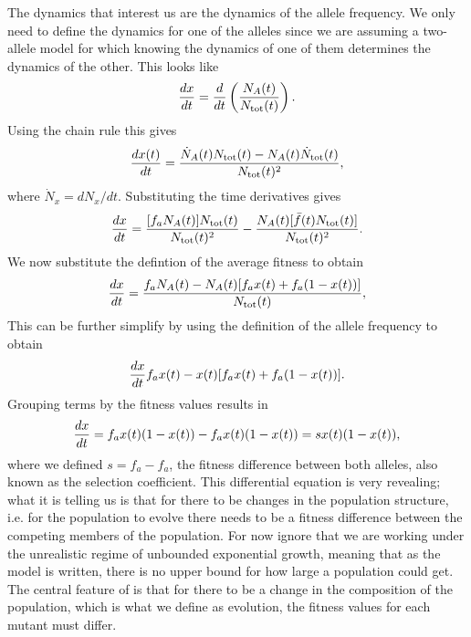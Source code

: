 The dynamics that interest us are the dynamics of the allele frequency. We only
need to define the dynamics for one of the alleles since we are assuming a
two-allele model for which knowing the dynamics of one of them determines the
dynamics of the other. This looks like
\begin{equation}
  {d{x} \over dt} = {d{} \over dt}\left( {N_A(t) \over N_{\text{tot}}(t)} \right).
\end{equation}
Using the chain rule this gives
\begin{equation}
  {d{x(t)} \over dt} = {\dot{N}_A(t) N_{\text{tot}}(t) - N_A(t) \dot{N}_{\text{tot}}(t) \over N_{\text{tot}}(t)^2},
\end{equation}
where $\dot{N}_x = dN_x / dt$. Substituting the time derivatives gives
\begin{equation}
  {d{x} \over dt} = {[f_a N_A(t)] N_{\text{tot}}(t) \over N_{\text{tot}}(t)^2} -
           {N_A(t)[\bar{f}(t) N_{\text{tot}}(t)] \over N_{\text{tot}}(t)^2}.
\end{equation}
We now substitute the defintion of the average fitness to obtain
\begin{equation}
  {d{x} \over dt} = {f_a N_A(t) - 
           N_A(t) [f_a x(t) + f_a (1 - x(t))]
          \over N_{\text{tot}}(t)},
\end{equation}
This can be further simplify by using the definition of the allele frequency to
obtain
\begin{equation}
  {d{x} \over dt} f_a x(t) - x(t)[f_a x(t) + f_a (1 - x(t))].
\end{equation}
Grouping terms by the fitness values results in
\begin{equation}
  {d{x} \over dt} = f_a x(t)(1 - x(t)) - f_a x(t)(1 - x(t))
  = s x(t)(1 - x(t)),
  \label{eq_freq_dynamics_selection}
\end{equation}
where we defined $s = f_a - f_a$, the fitness difference between both alleles,
also known as the selection coefficient. This differential equation is very
revealing; what it is telling us is that for there to be changes in the
population structure, i.e. for the population to evolve there needs to be a
fitness difference between the competing members of the population. For now
ignore that we are working under the unrealistic regime of unbounded
exponential growth, meaning that as the model is written, there is no upper
bound for how large a population could get. The central feature of
 is that for there to be a change in the
composition of the population, which is what we define as evolution, the
fitness values for each mutant must differ. 

